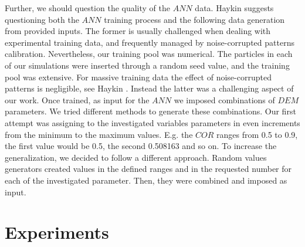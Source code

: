 \begin{appendix}
Further, we should question the quality of the $ANN$ data. Haykin \cite{RefWorks:158} 
suggests questioning both the $ANN$ training process and the following data
generation from provided inputs.
The former is usually challenged when dealing with experimental training data, and frequently 
managed by noise-corrupted patterns calibration. Nevertheless, our training pool
was numerical.
The particles in each of our simulations were inserted through a random
seed value, and the training pool was extensive.
For massive training data the effect of noise-corrupted patterns is negligible, see Haykin \cite{RefWorks:158}. 
Instead the latter was a challenging aspect of our work. Once trained, as input for the $ANN$ we imposed 
combinations of $DEM$ parameters. 
We tried different methods to generate these combinations. 
Our first attempt was assigning to the investigated variables parameters in even increments 
from the minimum to the maximum values. 
E.g. the $COR$ ranges from 0.5 to 0.9, the first value would be 0.5, the second 0.508163 and so on. 
To increase the generalization, we decided to follow a different approach. 
Random values generators created values in the defined ranges and in the requested 
number for each of the investigated parameter. Then, they were combined and imposed as input.\\



\section{Experiments}
\label{sec:appexperiments}


\end{appendix}
